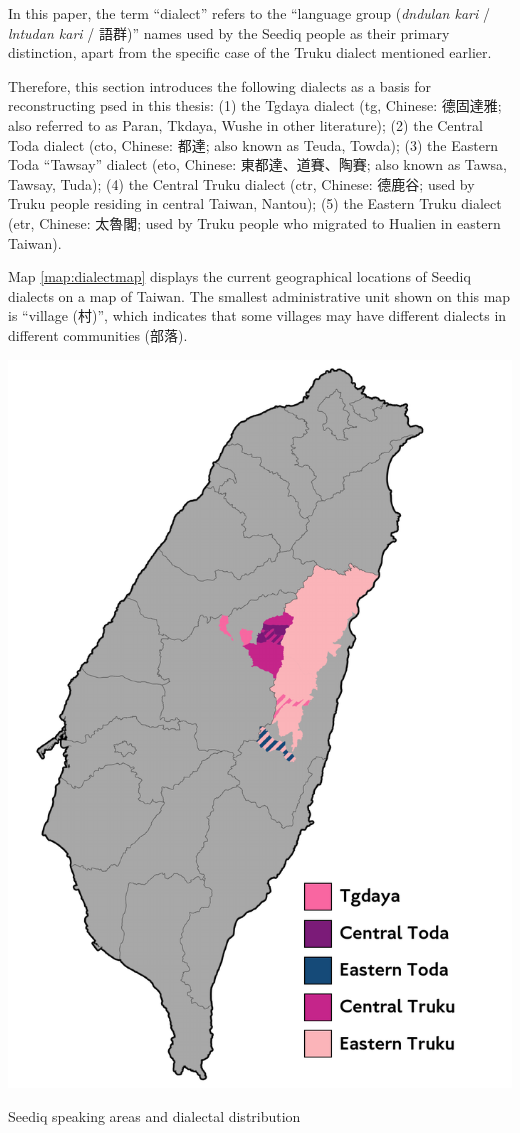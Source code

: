 In this paper, the term ``dialect'' refers to the ``language group (\textit{dndulan kari} / \textit{lntudan kari} / 語群)'' names used by the Seediq people as their primary distinction, apart from the specific case of the Truku dialect mentioned earlier. 

Therefore, this section introduces the following dialects as a basis for reconstructing \acl{psed} in this thesis: (1) the Tgdaya  dialect (\acs{tg}, Chinese: 德固達雅; also referred to as Paran, Tkdaya, Wushe in other literature); (2) the Central Toda dialect (\acs{cto}, Chinese: 都達; also known as Teuda, Towda); (3) the Eastern Toda ``Tawsay'' dialect (\acs{eto}, Chinese: 東都達、道賽、陶賽; also known as Tawsa, Tawsay, Tuda); (4) the Central Truku dialect (\acs{ctr}, Chinese: 德鹿谷; used by Truku people residing in central Taiwan, Nantou); (5) the Eastern Truku dialect (\acs{etr}, Chinese: 太魯閣; used by Truku people who migrated to Hualien in eastern Taiwan).

Map \ref{map:dialectmap} displays the current geographical locations of Seediq dialects on a map of Taiwan. The smallest administrative unit shown on this map is ``village (村)'', which indicates that some villages may have different dialects in different communities (部落).

\begin{map}
    \centering
    \includegraphics[width=1\linewidth]{img/dialectmap.pdf}
    \caption{Seediq speaking areas and dialectal distribution}
    \label{map:dialectmap}
\end{map}

